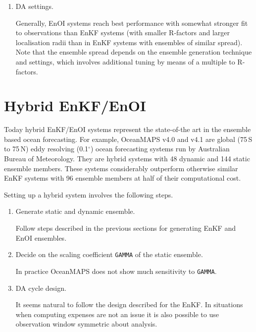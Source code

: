 \documentclass[11pt]{report}
\begin{document}
\begin{enumerate}
  With FGAT approach this means that at each DA cycle the model needs to be propagated for the half of DA cycle to the start of the next observation window and then further for the full cycle to the end of the observaiton window, i.e. for 1.5 DA cycle in total.
  The model needs to save restart at the time of the next analysis, i.e. after propagating for 1.0 DA cycle.

\item {DA settings.}

  Generally, EnOI systems reach best performance with somewhat stronger fit to observations than EnKF systems (with smaller R-factors and larger localisation radii than in EnKF systems with ensembles of similar spread).
  Note that the ensemble spread depends on the ensemble generation technique and  settings, which involves additional tuning by means of a multiple to R-factors.
  
\end{enumerate}

\section{Hybrid EnKF/EnOI}

Today hybrid EnKF/EnOI systems represent the state-of-the art in the ensemble based ocean forecasting.
For example, OceanMAPS v4.0 and v4.1 are global (75\,S to 75\,N) eddy resolving (0.1$^\circ$) ocean forecasting systems run by Australian Bureau of Meteorology.
They are hybrid systems with 48 dynamic and 144 static ensemble members.
These systems considerably outperform otherwise similar EnKF systems with 96 ensemble members at half of their computational cost.

Setting up a hybrid system involves the following steps.

\begin{enumerate}

\item {Generate static and dynamic ensemble.}

  Follow steps described in the previous sections for generating EnKF and EnOI ensembles.

\item{Decide on the scaling coefficient \verb|GAMMA| of the static ensemble.}

  In practice OceanMAPS does not show much sensitivity to \verb|GAMMA|.

\item{DA cycle design.}

  It seems natural to follow the design described for the EnKF.
  In situations when computing expenses are not an issue it is also possible to use observation window symmetric about analysis.

\end{enumerate}
\end{document}
